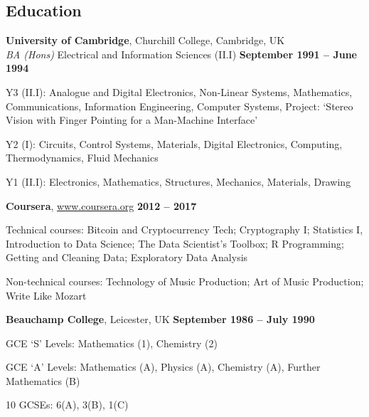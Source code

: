 \documentclass[line]{resume}
\begin{document}
\begin{resume}
    \section{\mysidestyle Education}

    \textbf{University of Cambridge}, Churchill College, Cambridge, UK \vspace{2mm}\\\vspace{1mm}%
    \textsl{BA (Hons)} Electrical and Information Sciences (II.I)\hfill \textbf{ September 1991 -- June 1994}\vspace{-3mm}\\\vspace{-1mm}%
    \begin{list2}
        \item Y3 (II.I): Analogue and Digital Electronics, Non-Linear Systems, 
            Mathematics, Communications, Information Engineering, Computer 
            Systems, Project: `Stereo Vision with Finger Pointing for a Man-Machine Interface'
        \item Y2 (I): Circuits, Control Systems, Materials, Digital Electronics, 
            Computing, Thermodynamics, Fluid Mechanics
        \item Y1 (II.I): Electronics, Mathematics, Structures, Mechanics, Materials,  Drawing
    \end{list2}\vspace{-1.5mm}

    \textbf{Coursera}, \url{www.coursera.org}\hfill \textbf{ 2012 -- 2017}\vspace{-3mm}\\\vspace{-1mm}%
    \begin{list2}
        \item Technical courses: Bitcoin and Cryptocurrency Tech; Cryptography I; Statistics I, Introduction to Data
              Science; The Data Scientist's Toolbox; R Programming; Getting and Cleaning Data; Exploratory Data Analysis
        \item Non-technical courses: Technology of Music Production; Art of Music Production; Write Like Mozart
    \end{list2}\vspace{-1.5mm}

    \textbf{Beauchamp College}, Leicester, UK\hfill \textbf{ September 1986 -- July 1990}\vspace{-3mm}\\\vspace{-1mm}%
    \begin{list2}
        \item GCE `S' Levels: Mathematics (1), Chemistry (2)
        \item GCE `A' Levels: Mathematics (A), Physics (A), Chemistry (A), Further Mathematics (B)
        \item 10 GCSEs: 6(A), 3(B), 1(C)
    \end{list2}\vspace{-1.5mm}
 

\end{resume}
\end{document}
